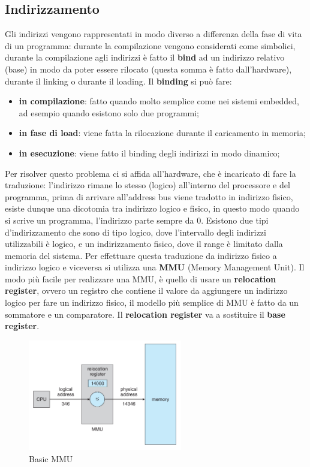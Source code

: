 \documentclass[12pt]{article}
\begin{document}
\subsection{Indirizzamento}
Gli indirizzi vengono rappresentati in modo diverso a differenza della fase di vita di un programma: durante la compilazione vengono considerati come simbolici, durante la compilazione agli indirizzi \`e fatto il \textbf{bind} ad un indirizzo relativo (base) in modo da poter essere rilocato (questa somma \`e fatto dall'hardware), durante il linking o durante il loading. Il \textbf{binding} si pu\`o fare:
\begin{itemize}
  \item \textbf{in compilazione}: fatto quando molto semplice come nei sistemi embedded, ad esempio quando esistono solo due programmi;
  \item \textbf{in fase di load}: viene fatta la rilocazione durante il caricamento in memoria;
  \item \textbf{in esecuzione}: viene fatto il binding degli indirizzi in modo dinamico;
\end{itemize}
Per risolver questo problema ci si affida all'hardware, che \`e incaricato di fare la traduzione: l'indirizzo rimane lo stesso (logico) all'interno del processore e del programma, prima di arrivare all'address bus viene tradotto in indirizzo fisico, esiste dunque una dicotomia tra indirizzo logico e fisico, in questo modo quando si scrive un programma, l'indirizzo parte sempre da $0$. Esistono due tipi d'indirizzamento che sono di tipo logico, dove l'intervallo degli indirizzi utilizzabili \`e logico, e un indirizzamento fisico, dove il range \`e limitato dalla memoria del sistema. Per effettuare questa traduzione da indirizzo fisico a indirizzo logico e viceversa si utilizza una \textbf{MMU} (Memory Management Unit). Il modo pi\`u facile per realizzare una MMU, \`e quello di usare un \textbf{relocation register}, ovvero un registro che contiene il valore da aggiungere un indirizzo logico per fare un indirizzo fisico, il modello pi\`u semplice di MMU \`e fatto da un sommatore e un comparatore. Il \textbf{relocation register} va a sostituire il \textbf{base register}.
\begin{figure}[H]
  \centering
  \includegraphics[width=0.6\textwidth]{basic-mmu.png}
  \caption{Basic MMU}
  \label{fig:basic-mmu}
\end{figure}
\end{document}
